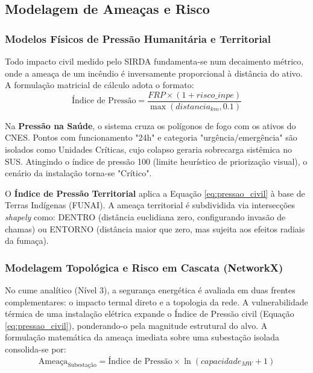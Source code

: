 \subsection{Modelagem de Ameaças e Risco}

\subsubsection{Modelos Físicos de Pressão Humanitária e Territorial}

Todo impacto civil medido pelo SIRDA fundamenta-se num decaimento métrico, onde a ameaça de um incêndio é inversamente proporcional à distância do ativo. A formulação matricial de cálculo adota o formato:
\begin{equation}
\label{eq:pressao_civil}
\text{Índice de Pressão} = \frac{FRP \times (1 + risco\_inpe)}{\max(distancia_{km}, 0.1)}
\end{equation}

Na \textbf{Pressão na Saúde}, o sistema cruza os polígonos de fogo com os ativos do CNES. Pontos com funcionamento "24h" e categoria "urgência/emergência" são isolados como Unidades Críticas, cujo colapso geraria sobrecarga sistêmica no SUS. Atingindo o índice de pressão 100 (limite heurístico de priorização visual), o cenário da instalação torna-se "Crítico".

O \textbf{Índice de Pressão Territorial} aplica a Equação \ref{eq:pressao_civil} à base de Terras Indígenas (FUNAI). A ameaça territorial é subdividida via intersecções \textit{shapely} como: DENTRO (distância euclidiana zero, configurando invasão de chamas) ou ENTORNO (distância maior que zero, mas sujeita aos efeitos radiais da fumaça).

\subsubsection{Modelagem Topológica e Risco em Cascata (NetworkX)}

No cume analítico (Nível 3), a segurança energética é avaliada em duas frentes complementares: o impacto termal direto e a topologia da rede. A vulnerabilidade térmica de uma instalação elétrica expande o Índice de Pressão civil (Equação \ref{eq:pressao_civil}), ponderando-o pela magnitude estrutural do alvo. A formulação matemática da ameaça imediata sobre uma subestação isolada consolida-se por:
\begin{equation}
\text{Ameaça}_{\text{Subestação}} = \text{Índice de Pressão} \times \ln(capacidade_{MW} + 1)
\end{equation}

